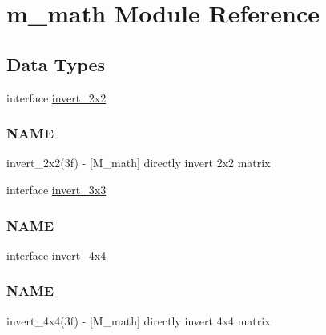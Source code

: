 \hypertarget{namespacem__math}{}\section{m\+\_\+math Module Reference}
\label{namespacem__math}
\subsection*{Data Types}
\begin{DoxyCompactItemize}
\item 
interface \hyperlink{interfacem__math_1_1invert__2x2}{invert\+\_\+2x2}
\begin{DoxyCompactList}\small\item\em \subsubsection*{N\+A\+ME}

invert\+\_\+2x2(3f) -\/ \mbox{[}M\+\_\+math\mbox{]} directly invert 2x2 matrix \end{DoxyCompactList}\item 
interface \hyperlink{interfacem__math_1_1invert__3x3}{invert\+\_\+3x3}
\begin{DoxyCompactList}\small\item\em \subsubsection*{N\+A\+ME}\end{DoxyCompactList}\item 
interface \hyperlink{interfacem__math_1_1invert__4x4}{invert\+\_\+4x4}
\begin{DoxyCompactList}\small\item\em \subsubsection*{N\+A\+ME}

invert\+\_\+4x4(3f) -\/ \mbox{[}M\+\_\+math\mbox{]} directly invert 4x4 matrix \end{DoxyCompactList}\end{DoxyCompactItemize}
